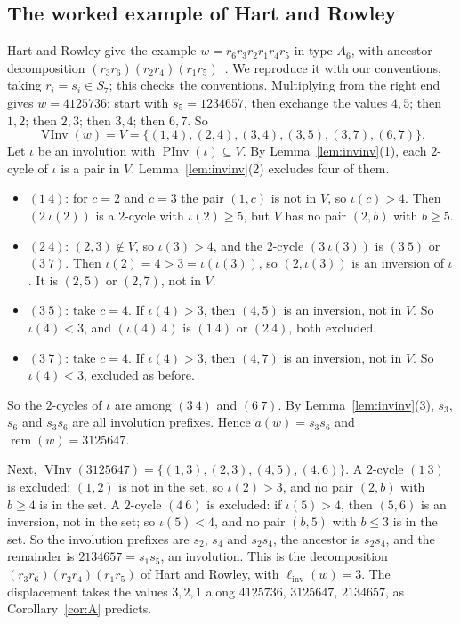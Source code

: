 \documentclass[11pt]{amsart}
\theoremstyle{definition}
\theoremstyle{remark}
\numberwithin{equation}{section}
\newcommand{\linv}{\ell_{\mathrm{inv}}}
\DeclareMathOperator{\rem}{rem}
\DeclareMathOperator{\PInv}{PInv}
\DeclareMathOperator{\VInv}{VInv}
\begin{document}
\subsection{The worked example of Hart and Rowley}
Hart and Rowley give the example \(w=r_6r_3r_2r_1r_4r_5\) in type \(A_6\), with ancestor decomposition \((r_3r_6)(r_2r_4)(r_1r_5)\)~\cite{HR}. We reproduce it with our conventions, taking \(r_i=s_i\in S_7\); this checks the conventions. Multiplying from the right end gives \(w=4125736\): start with \(s_5=1234657\), then exchange the values \(4,5\); then \(1,2\); then \(2,3\); then \(3,4\); then \(6,7\). So
\[
\VInv(w)=V=\{(1,4),(2,4),(3,4),(3,5),(3,7),(6,7)\}.
\]
Let \(\iota\) be an involution with \(\PInv(\iota)\subseteq V\). By Lemma~\ref{lem:invinv}(1), each \(2\)-cycle of \(\iota\) is a pair in \(V\). Lemma~\ref{lem:invinv}(2) excludes four of them.
\begin{itemize}
\item \((1\ 4)\): for \(c=2\) and \(c=3\) the pair \((1,c)\) is not in \(V\), so \(\iota(c)>4\). Then \((2\ \iota(2))\) is a \(2\)-cycle with \(\iota(2)\ge5\), but \(V\) has no pair \((2,b)\) with \(b\ge5\).
\item \((2\ 4)\): \((2,3)\notin V\), so \(\iota(3)>4\), and the \(2\)-cycle \((3\ \iota(3))\) is \((3\ 5)\) or \((3\ 7)\). Then \(\iota(2)=4>3=\iota(\iota(3))\), so \((2,\iota(3))\) is an inversion of \(\iota\). It is \((2,5)\) or \((2,7)\), not in \(V\).
\item \((3\ 5)\): take \(c=4\). If \(\iota(4)>3\), then \((4,5)\) is an inversion, not in \(V\). So \(\iota(4)<3\), and \((\iota(4)\ 4)\) is \((1\ 4)\) or \((2\ 4)\), both excluded.
\item \((3\ 7)\): take \(c=4\). If \(\iota(4)>3\), then \((4,7)\) is an inversion, not in \(V\). So \(\iota(4)<3\), excluded as before.
\end{itemize}
So the \(2\)-cycles of \(\iota\) are among \((3\ 4)\) and \((6\ 7)\). By Lemma~\ref{lem:invinv}(3), \(s_3\), \(s_6\) and \(s_3s_6\) are all involution prefixes. Hence \(a(w)=s_3s_6\) and \(\rem(w)=3125647\).

Next, \(\VInv(3125647)=\{(1,3),(2,3),(4,5),(4,6)\}\). A \(2\)-cycle \((1\ 3)\) is excluded: \((1,2)\) is not in the set, so \(\iota(2)>3\), and no pair \((2,b)\) with \(b\ge4\) is in the set. A \(2\)-cycle \((4\ 6)\) is excluded: if \(\iota(5)>4\), then \((5,6)\) is an inversion, not in the set; so \(\iota(5)<4\), and no pair \((b,5)\) with \(b\le3\) is in the set. So the involution prefixes are \(s_2\), \(s_4\) and \(s_2s_4\), the ancestor is \(s_2s_4\), and the remainder is \(2134657=s_1s_5\), an involution. This is the decomposition \((r_3r_6)(r_2r_4)(r_1r_5)\) of Hart and Rowley, with \(\linv(w)=3\). The displacement takes the values \(3,2,1\) along \(4125736\), \(3125647\), \(2134657\), as Corollary~\ref{cor:A} predicts.
\end{document}
